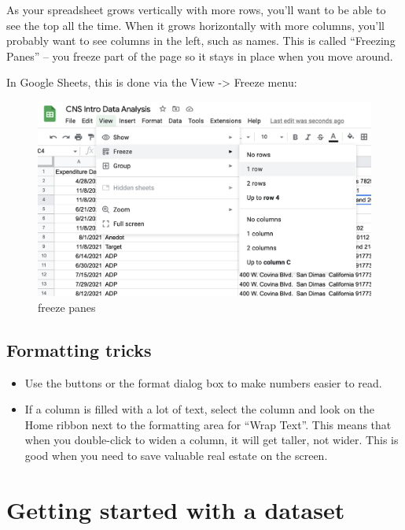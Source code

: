\documentclass[
  letterpaper,
  DIV=11,
  numbers=noendperiod]{scrreprt}
\begin{document}
As your spreadsheet grows vertically with more rows, you'll want to be
able to see the top all the time. When it grows horizontally with more
columns, you'll probably want to see columns in the left, such as names.
This is called ``Freezing Panes'' -- you freeze part of the page so it
stays in place when you move around.

In Google Sheets, this is done via the View -\textgreater{} Freeze menu:

\begin{figure}

{\centering \includegraphics[width=1\textwidth,height=\textheight]{./images/sheets-refresher-freezepanes.png}

}

\caption{freeze panes}

\end{figure}

\hypertarget{formatting-tricks}{%
\subsection{Formatting tricks}\label{formatting-tricks}}

\begin{itemize}
\item
  Use the buttons or the format dialog box to make numbers easier to
  read.
\item
  If a column is filled with a lot of text, select the column and look
  on the Home ribbon next to the formatting area for ``Wrap Text''. This
  means that when you double-click to widen a column, it will get
  taller, not wider. This is good when you need to save valuable real
  estate on the screen.
\end{itemize}

\hypertarget{getting-started-with-a-dataset}{%
\section{Getting started with a
dataset}\label{getting-started-with-a-dataset}}
\end{document}
